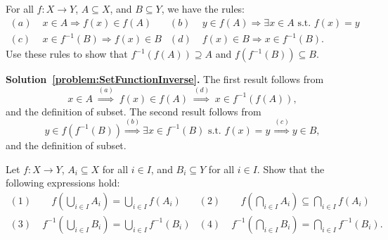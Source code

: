 \begin{problem}
\label{problem:SetFunctionInverse}
For all $f:X\rightarrow Y$, $A\subseteq X$, and $B\subseteq Y$, we have the rules:
\begin{align*}
(a) & \; x \in A \Rightarrow f(x) \in f(A) &
(b) & \; y \in f(A) \Rightarrow \exists x\in A \textrm{ s.t. } f(x)=y \\
(c) & \; x\in f^{-1}(B) \Rightarrow f(x) \in B &
(d) & \; f(x) \in B \Rightarrow x\in f^{-1}(B) .
\end{align*}
Use these rules to show that $f^{-1}(f(A)) \supseteq A$ and $f(f^{-1}(B)) \subseteq B$.
\end{problem}
\noindent \textbf{Solution~\ref{problem:SetFunctionInverse}.}
The first result follows from
\[ x\in A \; \stackrel{(a)}{\Rightarrow} \; f(x)\in f(A) \; \stackrel{(d)}{\Rightarrow} \; x\in f^{-1}(f(A)), \]
and the definition of subset.
The second result follows from
\[ y\in f(f^{-1}(B)) \stackrel{(b)}{\Rightarrow} \exists x\in f^{-1}(B) \textrm{ s.t. } f(x)=y \, \stackrel{(c)}{\Rightarrow} y\in B, \]
and the definition of subset.

\begin{problem}
Let $f \colon X\rightarrow Y$, $A_i \subseteq X$ for all $i\in I$, and $B_i \subseteq Y$ for all $i\in I$.
Show that the following expressions hold:
\begin{align*}
(1) & \;\;\;\:\, f \left( \bigcup_{i\in I} A_i \right) = \bigcup_{i\in I} f \left( A_i \right) &
(2) & \;\;\;\:\, f \left( \bigcap_{i\in I} A_i \right) \subseteq \bigcap_{i\in I} f \left( A_i \right) \\
(3) & \; f^{-1} \left( \bigcup_{i\in I} B_i \right) = \bigcup_{i\in I} f^{-1} \left( B_i \right) &
(4) & \; f^{-1} \left( \bigcap_{i\in I} B_i \right) = \bigcap_{i\in I} f^{-1} \left( B_i \right). 
\end{align*}
\end{problem}

